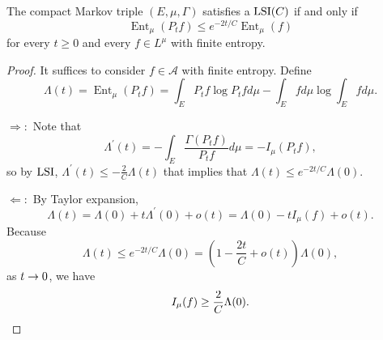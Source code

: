 \begin{prop}
    The compact Markov triple $(E,\mu,\Gamma)$ satisfies a $\operatorname{LSI}(C)$ if and only if
    \begin{equation*}
        \operatorname{Ent}_\mu\left(P_t f\right) \leq e^{-2 t / C} \operatorname{Ent}_\mu(f)
    \end{equation*}
    for every $t \geq 0$ and every $f \in L^{\mu}$ with finite entropy.
\end{prop}
\begin{proof}
    It suffices to consider $f \in \mathcal{A}$ with finite entropy. Define
    \begin{equation*}
        \Lambda(t)=\operatorname{Ent}_\mu\left(P_t f\right)=\int_E P_t f \log P_t f d \mu-\int_E  f d \mu \log \int_E  f d \mu.
    \end{equation*}

    $\Rightarrow:$ Note that
    \begin{equation*}
        \Lambda^{\prime}(t)=-\int_E \frac{\Gamma\left(P_t f\right)}{P_t f} d \mu=-I_\mu\left(P_t f\right),
    \end{equation*}
    so by $\operatorname{LSI}$, $\Lambda^{\prime}(t) \leq-\frac{2}{C} \Lambda(t)$ that implies that $\Lambda(t) \leq e^{-2 t / C} \Lambda(0)$.

    $\Leftarrow:$ By Taylor expansion,
    \begin{equation*}
        \Lambda(t)=\Lambda(0)+t \Lambda^{\prime}(0)+o(t)=\Lambda(0)-t I_\mu(f)+o(t).
    \end{equation*}
    Because
    \begin{equation*}
        \Lambda(t) \leq e^{-2 t / C} \Lambda(0)=\left(1-\frac{2 t}{C}+o(t)\right) \Lambda(0),
    \end{equation*}
    as $t \rightarrow 0$, we have
    \begin{equation*}
        I_\mu(f) \geq \frac{2}{C} \Lambda(0). \qedhere
    \end{equation*}
\end{proof}

